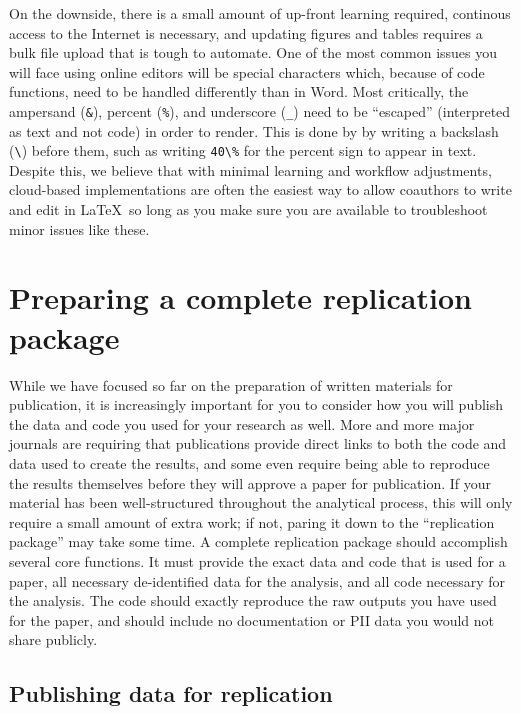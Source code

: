 On the downside, there is a small amount of up-front learning required,
continous access to the Internet is necessary,
and updating figures and tables requires a bulk file upload that is tough to automate.
One of the most common issues you will face using online editors will be special characters
which, because of code functions, need to be handled differently than in Word.
Most critically, the ampersand (\texttt{\&}), percent (\texttt{\%}), and underscore (\texttt{\_})
need to be ``escaped'' (interpreted as text and not code) in order to render.
This is done by by writing a backslash (\texttt{\textbackslash}) before them,
such as writing \texttt{40\textbackslash\%} for the percent sign to appear in text.
Despite this, we believe that with minimal learning and workflow adjustments,
cloud-based implementations are often the easiest way to allow coauthors to write and edit in \LaTeX\,
so long as you make sure you are available to troubleshoot minor issues like these.


\section{Preparing a complete replication package}

While we have focused so far on the preparation of written materials for publication,
it is increasingly important for you to consider how you will publish
the data and code you used for your research as well.
More and more major journals are requiring that publications
provide direct links to both the code and data used to create the results,
and some even require being able to reproduce the results themselves
before they will approve a paper for publication.
If your material has been well-structured throughout the analytical process,
this will only require a small amount of extra work;
if not, paring it down to the ``replication package'' may take some time.
A complete replication package should accomplish several core functions.
It must provide the exact data and code that is used for a paper,
all necessary de-identified data for the analysis,
and all code necessary for the analysis.
The code should exactly reproduce the raw outputs you have used for the paper,
and should include no documentation or PII data you would not share publicly.

\subsection{Publishing data for replication}

